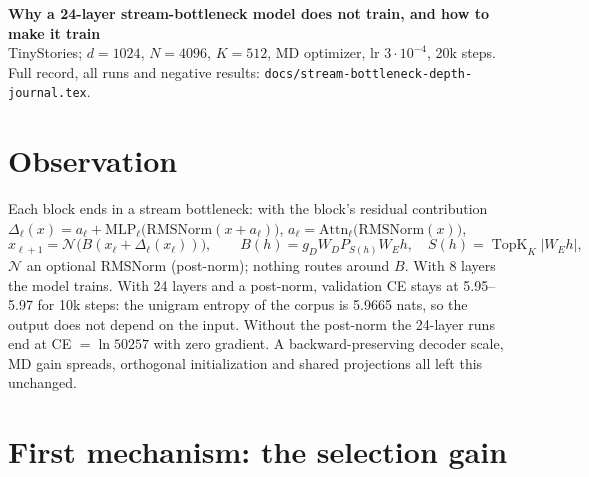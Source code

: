\documentclass[10pt,a4paper]{article}
\newcommand{\code}[1]{\texttt{#1}}
\newcommand{\topk}{\operatorname{TopK}}
\begin{document}
{\centering
{\large\bfseries Why a 24-layer stream-bottleneck model does not train, and how to make it train}\\[1pt]
{\small TinyStories; \(d=1024\), \(N=4096\), \(K=512\), MD optimizer, lr \(3\!\cdot\!10^{-4}\), 20k steps.
Full record, all runs and negative results: \code{docs/stream-bottleneck-depth-journal.tex}.}\par}

\section{Observation}

Each block ends in a stream bottleneck: with the block's residual contribution
\(\Delta_\ell(x)=a_\ell+\mathrm{MLP}_\ell\bigl(\mathrm{RMSNorm}(x+a_\ell)\bigr)\), \(a_\ell=\mathrm{Attn}_\ell\bigl(\mathrm{RMSNorm}(x)\bigr)\),
\begin{equation*}
  x_{\ell+1}=\mathcal N\bigl(B(x_\ell+\Delta_\ell(x_\ell))\bigr),\qquad
  B(h)=g_DW_DP_{S(h)}W_Eh,\quad S(h)=\topk_K|W_Eh|,
\end{equation*}
\(\mathcal N\) an optional RMSNorm (post-norm); nothing routes around \(B\).  With 8 layers the model trains.
With 24 layers and a post-norm, validation CE stays at 5.95--5.97 for 10k steps: the unigram entropy of the
corpus is 5.9665 nats, so the output does not depend on the input.  Without the post-norm the 24-layer runs end
at CE \(=\ln 50257\) with zero gradient.  A backward-preserving decoder scale, MD gain spreads, orthogonal
initialization and shared projections all left this unchanged.

\section{First mechanism: the selection gain}
\end{document}
